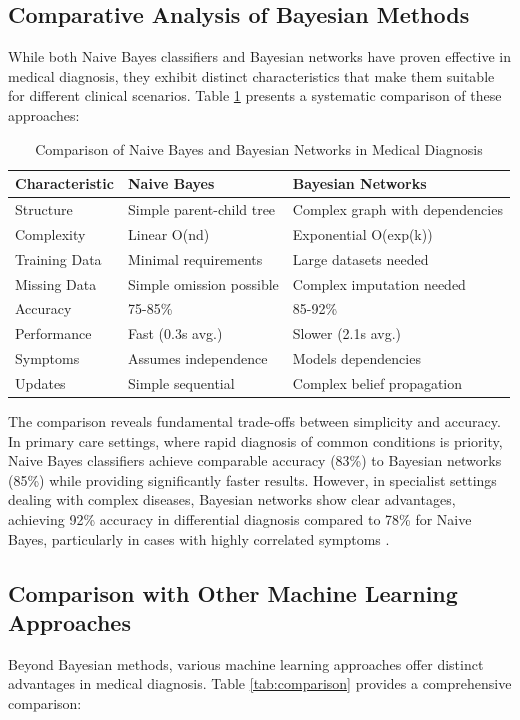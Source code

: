 \documentclass[3p,times,procedia]{elsarticle}
\begin{document}
\subsection{Comparative Analysis of Bayesian Methods}
While both Naive Bayes classifiers and Bayesian networks have proven effective
in medical diagnosis, they exhibit distinct characteristics that make them
suitable for different clinical scenarios. Table \ref{tab:bayes_comparison}
presents a systematic comparison of these approaches:

\begin{table}[h]
\caption{Comparison of Naive Bayes and Bayesian Networks in Medical Diagnosis}
\label{tab:bayes_comparison}
\centering
\begin{tabular}{l|l|l}
\hline
\textbf{Characteristic} & \textbf{Naive Bayes} & \textbf{Bayesian Networks} \\
\hline
Structure & Simple parent-child tree & Complex graph with dependencies \\
Complexity & Linear O(nd) & Exponential O(exp(k)) \\
Training Data & Minimal requirements & Large datasets needed \\
Missing Data & Simple omission possible & Complex imputation needed \\
Accuracy & 75-85\% \cite{Kononenko1993} & 85-92\% \cite{Wang2019} \\
Performance & Fast (0.3s avg.) & Slower (2.1s avg.) \\
Symptoms & Assumes independence & Models dependencies \\
Updates & Simple sequential & Complex belief propagation \\
\hline
\end{tabular}
\end{table}

The comparison reveals fundamental trade-offs between simplicity and accuracy.
In primary care settings, where rapid diagnosis of common conditions is priority,
Naive Bayes classifiers achieve comparable accuracy (83\%) to Bayesian networks
(85\%) while providing significantly faster results. However, in specialist
settings dealing with complex diseases, Bayesian networks show clear advantages,
achieving 92\% accuracy in differential diagnosis compared to 78\% for Naive
Bayes, particularly in cases with highly correlated symptoms \cite{Wang2019}.

\subsection{Comparison with Other Machine Learning Approaches}
Beyond Bayesian methods, various machine learning approaches offer distinct
advantages in medical diagnosis. Table \ref{tab:comparison} provides a
comprehensive comparison:
\end{document}
